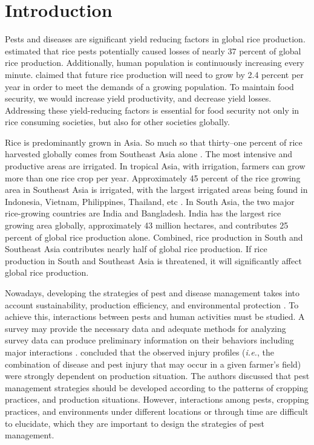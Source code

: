 \section*{Introduction}
Pests and diseases are significant yield reducing factors in global rice production. \citet{Oerke_2005_Crop} estimated that rice pests potentially caused losses of nearly 37 percent of global rice production. Additionally, human population is continuously increasing every minute. \citet{Ray_2013_Yield} claimed that future rice production will need to grow by 2.4 percent per year in order to meet the demands of a growing population. To maintain food security, we would increase yield productivity, and decrease yield losses. Addressing these yield-reducing factors is essential for food security not only in rice consuming societies, but also for other societies globally.

Rice is predominantly grown in Asia. So much so that thirty--one percent of rice harvested globally comes from Southeast Asia alone \citep{OECD_2012_Agricultural}. The most intensive and productive areas are irrigated. In tropical Asia, with irrigation, farmers can grow more than one rice crop per year. Approximately 45 percent of the rice growing area in Southeast Asia is irrigated, with the largest irrigated areas being found in Indonesia, Vietnam, Philippines, Thailand, etc \citep{Mutert_2002_Developments}. In South Asia, the two major rice-growing countries are India and Bangladesh. India has the largest rice growing area globally, approximately 43 million hectares, and contributes 25 percent of global rice production alone. Combined, rice production in South and Southeast Asia contributes nearly half of global rice production. If rice production in South and Southeast Asia is threatened, it will significantly affect global rice production.  

Nowadays, developing the strategies of pest and disease management takes into account sustainability, production efficiency, and environmental protection \citep{Mew_2004_Looking}. To achieve this, interactions between pests and human activities must be studied. A survey may provide the necessary data and adequate methods for analyzing survey data can produce preliminary information on their behaviors including major interactions \citep{Savary_1995_Use}. \citet{Savary_2000_Characterization} concluded that the observed injury profiles (\textit{i.e.}, the combination of disease and pest injury that may occur in a given farmer's field) were strongly dependent on production situation.  The authors discussed that pest management strategies should be developed according to the patterns of cropping practices, and production situations. However, interactions among pests, cropping practices, and environments under different locations or through time are difficult to elucidate, which they are important to design the strategies of pest management.

